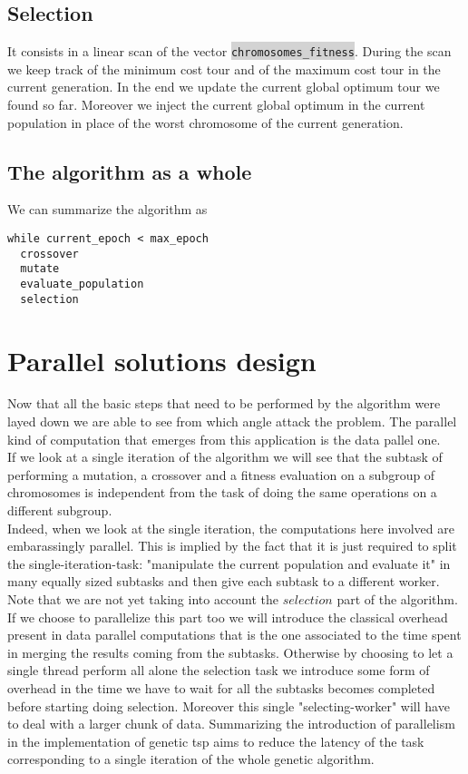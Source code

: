 \documentclass[11pt]{article}
\newcommand{\inlinecode}[2]{\colorbox{lightgray}{\lstinline[language=#1]$#2$}}
\begin{document}
\subsection{Selection}
It consists in a linear scan of the vector \inlinecode{C++}{chromosomes_fitness}. During the scan we keep track of the minimum cost tour and of the maximum cost tour in the current generation. In the end we update the current global optimum tour we found so far. Moreover we inject the current global optimum in the current population in place of the worst chromosome of the current generation.

\subsection{The algorithm as a whole}
We can summarize the algorithm as
\begin{lstlisting}
while current_epoch < max_epoch
  crossover
  mutate
  evaluate_population
  selection
\end{lstlisting}

\section{Parallel solutions design}
Now that all the basic steps that need to be performed by the algorithm were layed down we are able to see from which angle attack the problem. The parallel kind of computation that emerges from this application is the data pallel one.\\

If we look at a single iteration of the algorithm we will see that the subtask of performing a mutation, a crossover and a fitness evaluation on a subgroup of chromosomes is independent from the task of doing the same operations on a different subgroup.\\

Indeed, when we look at the single iteration, the computations here involved are embarassingly parallel. This is implied by the fact that it is just required to split the single-iteration-task: "manipulate the current population and evaluate it" in many equally sized subtasks and then give each subtask to a different worker.\\
Note that we are not yet taking into account the $ selection $ part of the algorithm.
If we choose to parallelize this part too we will introduce the classical overhead present in data parallel computations that is the one associated to the time spent in merging the results coming from the subtasks. Otherwise by choosing to let a single thread perform all alone the selection task we introduce some form of overhead in the time we have to wait for all the subtasks becomes completed before starting doing selection. Moreover this single "selecting-worker" will have to deal with a larger chunk of data.
Summarizing the introduction of parallelism in the implementation of genetic tsp aims to reduce the latency of the task corresponding to a single iteration of the whole genetic algorithm.
\end{document}
